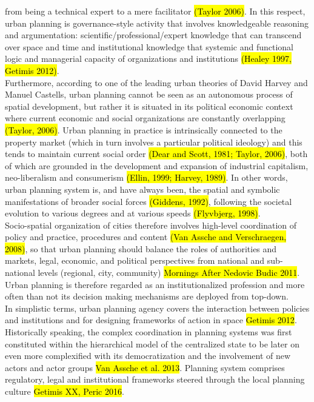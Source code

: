\documentclass[11pt]{report}
\begin{document}
from being a technical expert to a mere facilitator \hl{(Taylor 2006)}.
In this respect, urban planning is governance-style activity that involves knowledgeable reasoning and argumentation: scientific/professional/expert knowledge that can transcend over space and time and institutional knowledge that systemic and functional logic and managerial capacity of organizations and institutions \hl{(Healey 1997, Getimis 2012)}.
\\ 
Furthermore, according to one of the leading urban theories of David Harvey and Manuel Castells, urban planning cannot be seen as an autonomous process of spatial development, but rather it is situated in its political economic context where current economic and social organizations are constantly overlapping \hl{(Taylor, 2006)}.
Urban planning in practice is intrinsically connected to the property market (which in turn involves a particular political ideology) and this tends to maintain current social order \hl{(Dear and Scott, 1981; Taylor, 2006)}, both of which are grounded in the development and expansion of industrial capitalism, neo-liberalism and consumerism \hl{(Ellin, 1999; Harvey, 1989)}. In other words, urban planning system is, and have always been, the spatial and symbolic manifestations of broader social forces \hl{(Giddens, 1992)}, following the societal evolution to various degrees and at various speeds \hl{(Flyvbjerg, 1998)}.
\\
Socio-spatial organization of cities therefore involves high-level coordination of policy and practice, procedures and content \hl{(Van Assche and Verschraegen, 2008)}, so that urban planning should balance the roles of authorities and markets, legal, economic, and political perspectives from national and sub-national levels (regional, city, community) \hl{Mornings After Nedovic Budic 2011}.
Urban planning is therefore regarded as an institutionalized profession and more often than not its decision making mechanisms are deployed from top-down.
\\
In simplistic terms, urban planning agency covers the interaction between policies and institutions and for designing frameworks of action in space \hl{Getimis 2012}.
Historically speaking, the complex coordination in planning systems was first constituted within the hierarchical model of the centralized state to be later on even more complexified with its democratization and the involvement of new actors and actor groups
\hl{Van Assche et al. 2013}.
Planning system comprises regulatory, legal and institutional frameworks steered through the local planning culture \hl{Getimis XX, Peric 2016}.
\end{document}
